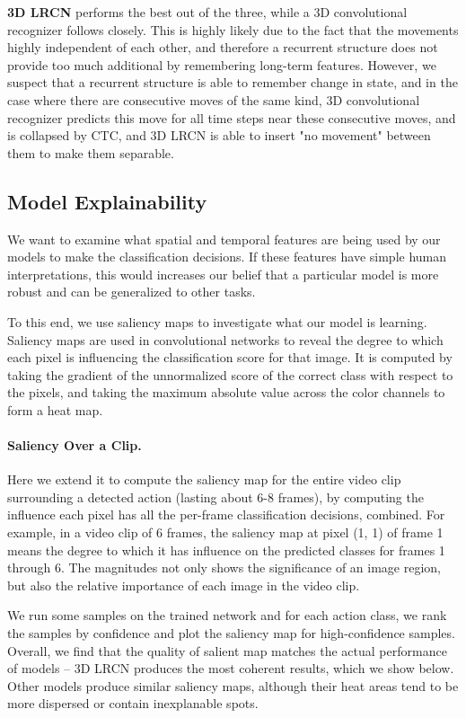 \documentclass[10pt,twocolumn,letterpaper]{article}
\begin{document}
\textbf{3D LRCN} performs the best out of the three, while a 3D convolutional recognizer follows closely. This is highly likely due to the fact that the movements highly independent of each other, and therefore a recurrent structure does not provide too much additional by remembering long-term features. However, we suspect that a recurrent structure is able to remember change in state, and in the case where there are consecutive moves of the same kind, 3D convolutional recognizer predicts this move for all time steps near these consecutive moves, and is collapsed by CTC, and 3D LRCN is able to insert "no movement" between them to make them separable.



\subsection{Model Explainability}

We want to examine what spatial and temporal features are being used by our models to make the classification decisions. If these features have simple human interpretations, this would increases our belief that a particular model is more robust and can be generalized to other tasks.   

To this end, we use saliency maps \cite{simonyan2013deep} to investigate what our model is learning. Saliency maps are used in convolutional networks to reveal the degree to which each pixel is influencing the classification score for that image. It is computed by taking the gradient of the unnormalized score of the correct class with respect to the pixels, and taking the maximum absolute value across the color channels to form a heat map. 

\paragraph{Saliency Over a Clip.} Here we extend it to compute the saliency map for the entire video clip surrounding a detected action (lasting about 6-8 frames), by computing the influence each pixel has all the per-frame classification decisions, combined. For example, in a video clip of 6 frames, the saliency map at pixel (1, 1) of frame 1 means the degree to which it has influence on the predicted classes for frames 1 through 6. The magnitudes not only shows the significance of an image region, but also the relative importance of each image in the video clip.

We run some samples on the trained network and for each action class, we rank the samples by confidence and plot the saliency map for high-confidence samples. Overall, we find that the quality of salient map matches the actual performance of models -- 3D LRCN produces the most coherent results, which we show below. Other models produce similar saliency maps, although their heat areas tend to be more dispersed or contain inexplanable spots. 
\end{document}
